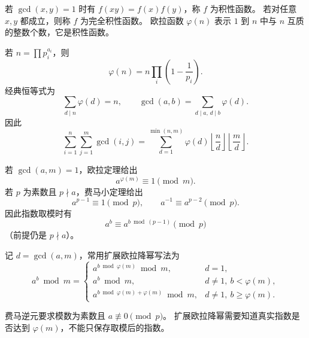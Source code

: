 若 $\gcd(x,y)=1$ 时有 $f(xy)=f(x)f(y)$，称 $f$ 为积性函数。
若对任意 $x,y$ 都成立，则称 $f$ 为完全积性函数。
欧拉函数 $\varphi(n)$ 表示 $1$ 到 $n$ 中与 $n$ 互质的整数个数，它是积性函数。

若 $n=\prod p_i^{a_i}$，则
\[
  \varphi(n)=n\prod_i\left(1-\frac1{p_i}\right).
\]
经典恒等式为
\[
  \sum_{d\mid n}\varphi(d)=n,
  \qquad
  \gcd(a,b)=\sum_{d\mid a,\,d\mid b}\varphi(d).
\]
因此
\[
  \sum_{i=1}^{n}\sum_{j=1}^{m}\gcd(i,j)
  =\sum_{d=1}^{\min(n,m)}\varphi(d)
    \left\lfloor\frac nd\right\rfloor
    \left\lfloor\frac md\right\rfloor.
\]

若 $\gcd(a,m)=1$，欧拉定理给出
\[
  a^{\varphi(m)}\equiv1\pmod m.
\]
若 $p$ 为素数且 $p\nmid a$，费马小定理给出
\[
  a^{p-1}\equiv1\pmod p,
  \qquad a^{-1}\equiv a^{p-2}\pmod p.
\]
因此指数取模时有
\[
  a^b\equiv a^{b\bmod(p-1)}\pmod p
\]
（前提仍是 $p\nmid a$）。

记 $d=\gcd(a,m)$，常用扩展欧拉降幂写法为
\[
  a^b\bmod m=
  \begin{cases}
    a^{b\bmod\varphi(m)}\bmod m,&d=1,\\
    a^b\bmod m,&d\ne1,\ b<\varphi(m),\\
    a^{b\bmod\varphi(m)+\varphi(m)}\bmod m,&d\ne1,\ b\ge\varphi(m).
  \end{cases}
\]

\begin{icpcwarning}[适用条件]
  费马逆元要求模数为素数且 $a\not\equiv0\pmod p$。
  扩展欧拉降幂需要知道真实指数是否达到 $\varphi(m)$，不能只保存取模后的指数。
\end{icpcwarning}
